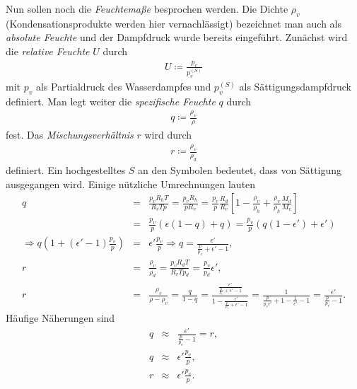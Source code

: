 \documentclass{book}
\begin{document}
Nun sollen noch die \textit{Feuchtemaße} besprochen werden. Die Dichte $\rho_v$ (Kondensationsprodukte werden hier vernachlässigt) bezeichnet man auch als \textit{absolute Feuchte} und der Dampfdruck wurde bereits eingeführt. Zunächst wird die \textit{relative Feuchte} $U$ durch
%
\begin{eqnarray}
U \coloneqq\frac{p_v}{p_v^{(S)}}
\end{eqnarray}
%
mit $p_v$ als Partialdruck des Wasserdampfes und $p_v^{(S)}$ als Sättigungsdampfdruck definiert. Man legt weiter die \textit{spezifische Feuchte} $q$ durch
%
\begin{eqnarray}
q \coloneqq\frac{\rho_v}{\rho}\label{eq:def_spec_humidity}
\end{eqnarray}
%
fest. Das \textit{Mischungsverhältnis} $r$ wird durch
%
\begin{eqnarray}
r \coloneqq\frac{\rho_v}{\rho_d}
\end{eqnarray}
%
definiert. Ein hochgestelltes $S$ an den Symbolen bedeutet, dass von Sättigung ausgegangen wird. Einige nützliche Umrechnungen lauten
%
\begin{eqnarray}
q & = & \frac{p_vR_hT}{R_vT p} = \frac{p_vR_h}{pR_v} = \frac{p_v}{p}\frac{R_d}{R_v}\left[1 - \frac{\rho_v}{\rho_h} + \frac{\rho_v}{\rho_h}\frac{M_d}{M_v}\right]\nonumber\\
& = & \frac{p_v}{p}\left(\epsilon\left(1 - q\right) + q\right) = \frac{p_v}{p}\left(q\left(1 - \epsilon'\right) + \epsilon'\right)\nonumber\\
\Rightarrow q\left(1 + \left(\epsilon' - 1\right)\frac{p_v}{p}\right) & = & \epsilon'\frac{p_v}{p}\Rightarrow q = \frac{\epsilon'}{\frac{p}{p_v} + \epsilon' - 1},\\
r & = & \frac{\rho_v}{\rho_d} = \frac{p_vR_dT}{R_vTp_d} = \frac{p_v}{p_d}\epsilon', \nonumber\\
r & = & \frac{\rho_v}{\rho - \rho_v} = \frac{q}{1 - q} = \frac{\frac{\epsilon'}{\frac{p}{p_v} + \epsilon' - 1}}{1 - \frac{\epsilon'}{\frac{p}{p_v} + \epsilon' - 1}} = \frac{1}{\frac{p}{p_v\epsilon'} + 1 - \frac{1}{\epsilon'} - 1} = \frac{\epsilon'}{\frac{p}{p_v} - 1}.
\end{eqnarray}
%
Häufige Näherungen sind
%
\begin{eqnarray}
q&\approx&\frac{\epsilon'}{\frac{p}{p_v} - 1} = r,\\
q&\approx&\epsilon'\frac{p_v}{p},\\
r&\approx&\epsilon'\frac{p_v}{p}.\label{eq:mischungsverhaeltnis_vereinfacht}
\end{eqnarray}
%
\end{document}
